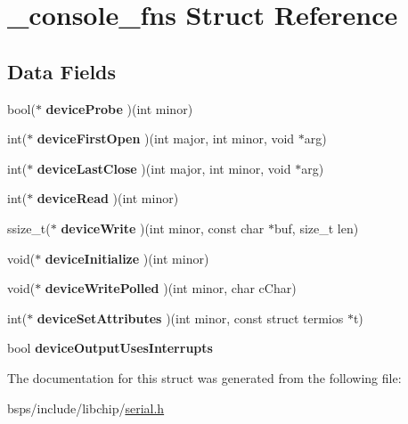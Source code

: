 \hypertarget{struct__console__fns}{}\section{\+\_\+console\+\_\+fns Struct Reference}
\label{struct__console__fns}
\subsection*{Data Fields}
\begin{DoxyCompactItemize}
\item 
\mbox{\label{struct__console__fns_a4f44e9594fbab3df6fec3eab4415c0d9}} 
bool($\ast$ {\bfseries device\+Probe} )(int minor)
\item 
\mbox{\label{struct__console__fns_a3fc9ba2262b15b591a2955203e0f8cfb}} 
int($\ast$ {\bfseries device\+First\+Open} )(int major, int minor, void $\ast$arg)
\item 
\mbox{\label{struct__console__fns_a9a8ebc7b246b324b6a858426b995565a}} 
int($\ast$ {\bfseries device\+Last\+Close} )(int major, int minor, void $\ast$arg)
\item 
\mbox{\label{struct__console__fns_abd3017079ffd93f0fd59e07bb76bda64}} 
int($\ast$ {\bfseries device\+Read} )(int minor)
\item 
\mbox{\label{struct__console__fns_ab120424c164ac7a4d2a445645946772f}} 
ssize\+\_\+t($\ast$ {\bfseries device\+Write} )(int minor, const char $\ast$buf, size\+\_\+t len)
\item 
\mbox{\label{struct__console__fns_a3706a64866487a94b6f8a125a9a5f28c}} 
void($\ast$ {\bfseries device\+Initialize} )(int minor)
\item 
\mbox{\label{struct__console__fns_a7329c7e7d33bca9ccc2a88522b573240}} 
void($\ast$ {\bfseries device\+Write\+Polled} )(int minor, char c\+Char)
\item 
\mbox{\label{struct__console__fns_a782df0db8e6e30e963119b9cff60bf46}} 
int($\ast$ {\bfseries device\+Set\+Attributes} )(int minor, const struct termios $\ast$t)
\item 
\mbox{\label{struct__console__fns_af531bc746ac2dd6bb84d45ba4427b724}} 
bool {\bfseries device\+Output\+Uses\+Interrupts}
\end{DoxyCompactItemize}


The documentation for this struct was generated from the following file\+:\begin{DoxyCompactItemize}
\item 
bsps/include/libchip/\mbox{\hyperlink{serial_8h}{serial.\+h}}\end{DoxyCompactItemize}
